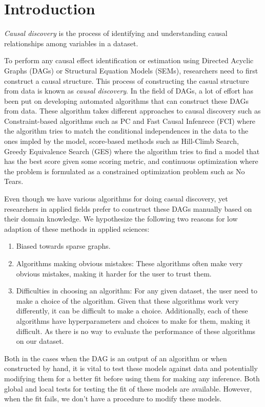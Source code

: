 \documentclass[letterpaper]{article} %
\begin{document}
\section{Introduction}

\emph{Causal discovery} is the process of identifying and understanding causal
relationships among variables in a dataset. 

To perform any causal effect identification or estimation using Directed
Acyclic Graphs (DAGs) or Structural Equation Models (SEMs), researchers need to
first construct a causal structure. This process of constructing the casual
structure from data is known as \emph{causal discovery}. In the field of DAGs,
a lot of effort has been put on developing automated algorithms that can
construct these DAGs from data. These algorithm takes different approaches to
causal discovery such as Constraint-based algorithms such as PC and Fast Causal
Infenrece (FCI) where the algorithm tries to match the conditional
independences in the data to the ones impled by the model, score-based methods
such as Hill-Climb Search, Greedy Equivalence Search (GES)  where the algorithm
tries to find a model that has the best score given some scoring metric, and
continuous optimization where the problem is formulated as a constrained
optimization problem such as No Tears.

Even though we have various algorithms for doing casual discovery, yet
researchers in applied fields prefer to construct these DAGs manually based on
their domain knowledge. We hypothesize the following two reasons for low
adaption of these methods in applied sciences:

\begin{enumerate}
	\item Biased towards sparse graphs.
	\item Algorithms making obvious mistakes: These algorithms often make
		very obvious mistakes, making it harder for the user to trust
		them.
	\item Difficulties in choosing an algorithm: For any given dataset, the
		user need to make a choice of the algorithm. Given that these
		algorithms work very differently, it can be difficult to make a
		choice. Additionally, each of these algorithms have
		hyperparameters and choices to make for them, making it
		difficult. As there is no way to evaluate the performance of
		these algorithms on our dataset.
\end{enumerate}

Both in the cases when the DAG is an output of an algorithm or when constructed
by hand, it is vital to test these models against data and potentially modifying 
them for a better fit before using them for making any inference. Both global
and local tests for testing the fit of these models are available. However, when
the fit fails, we don't have a procedure to modify these models.
\end{document}

